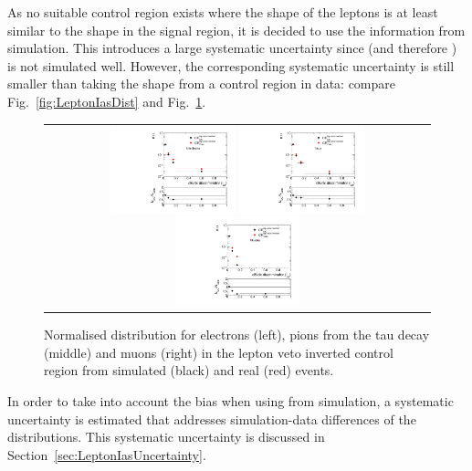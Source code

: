As no suitable control region exists where the \ias shape of the leptons is at least similar to the shape in the signal region, it is decided to use the \ias information from simulation.
This introduces a large systematic uncertainty since \dedx (and therefore \ias) is not simulated well.
However, the corresponding systematic uncertainty is still smaller than taking the \ias shape from a control region in data: compare Fig.~\ref{fig:LeptonIasDist} and Fig.~\ref{fig:LeptonIasDistData}.
\begin{figure}[!tb]
  \centering 
  \begin{tabular}{c}
    \includegraphics[width=0.33\textwidth]{figures/analysis/Background/hASmi_Electrons_MCCR_DataCR.pdf}
    \includegraphics[width=0.33\textwidth]{figures/analysis/Background/hASmi_Taus_MCCR_DataCR.pdf}
    \includegraphics[width=0.33\textwidth]{figures/analysis/Background/hASmi_Muons_MCCR_DataCR.pdf}
  \end{tabular}
  \caption{Normalised \ias distribution for electrons (left), pions from the tau decay (middle) and muons (right) in the lepton veto inverted control region from simulated (black) and real (red) events.}
  \label{fig:LeptonIasDistData}
\end{figure}

In order to take into account the bias when using \ias from simulation, a systematic uncertainty is estimated that addresses simulation-data differences of the \ias distributions.
This systematic uncertainty is discussed in Section~\ref{sec:LeptonIasUncertainty}.
